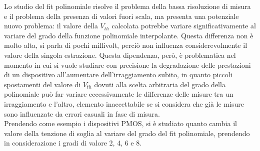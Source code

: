 \documentclass[
	a4paper,
	cleardoublepage=empty,
	headings=twolinechapter,
	numbers=autoenddot,
]{scrbook}
\begin{document}
Lo studio del fit polinomiale risolve il problema della bassa risoluzione di misura e il problema della presenza di valori fuori scala, ma presenta una potenziale nuovo problema: il valore della $V_{th}$ calcolata potrebbe variare significativamente al variare del grado della funzione polinomiale interpolante. Questa differenza non è molto alta, si parla di pochi millivolt, perciò non influenza considerevolmente il valore della singola estrazione. Questa dipendenza, però, è problematica nel momento in cui si vuole studiare con precisione la degradazione delle prestazioni di un dispositivo all'aumentare dell'irraggiamento subito, in quanto piccoli spostamenti del valore di $V_{th}$ dovuti alla scelta arbitraria del grado della polinomiale può far variare eccessivamente le differenze delle misure tra un irraggiamento e l'altro, elemento inaccettabile se si considera che già le misure sono influenzate da errori casuali in fase di misura.\\
Prendendo come esempio i dispositivi PMOS, si è studiato quanto cambia il valore della tenzione di soglia al variare del grado del fit polinomiale, prendendo in considerazione i gradi di valore 2, 4, 6 e 8.\\
\end{document}
